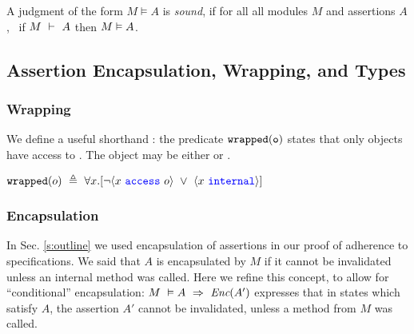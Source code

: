 \begin{definition}
\label{ax:specW-prove-soundness}
A judgment of the form $M \vDash A$ is \emph{sound}, if for all
  all modules $M$ and assertions $A$, \ if $M\ \vdash\ A$ then $M \vDash A$.
\end{definition}

\subsection{Assertion Encapsulation, Wrapping, and Types}

\subsubsection{Wrapping}

We define a useful shorthand : the predicate $\texttt{wrapped}( {\texttt{o}} )$    states 
that only \internalO objects have access to .
The object  may be either \internalO or \externalO.
\begin{definition}[Wrapped]
$\texttt{wrapped}( o )\ \triangleq\ \forall x.[\neg \langle x\ {\color{blue}\texttt{access}}\ o \rangle\ \vee\ \langle x\ {\color{blue}\texttt{internal}}\rangle]$
\end{definition}


\subsubsection{Encapsulation} In Sec. \ref{s:outline} we used  encapsulation of \SpecO assertions 
 in our proof of adherence to \Nec specifications.
We said that   $A$ is encapsulated by  $M$ if it cannot be invalidated unless an
internal method was called. 
Here we refine this concept, to allow for ``conditional'' encapsulation:
$M\ \vDash A\ \Rightarrow\ \textit{Enc}(A')$ expresses that in states which satisfy $A$, the assertion 
$A'$ cannot be invalidated, unless a method from $M$ was called.

